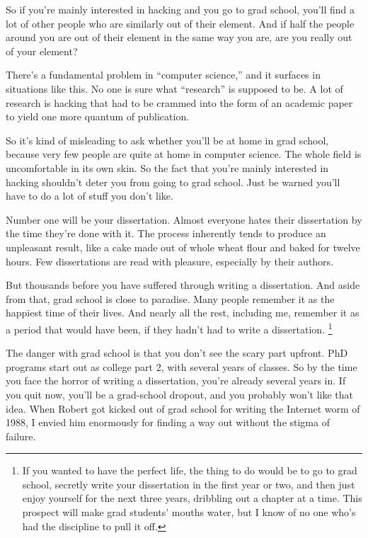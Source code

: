 So if you're mainly interested in hacking and you go to grad school,
you'll find a lot of other people who are similarly out of their
element. And if half the people around you are out of their element in
the same way you are, are you really out of your element?

There's a fundamental problem in ``computer science,'' and it surfaces
in situations like this. No one is sure what ``research'' is supposed to
be. A lot of research is hacking that had to be crammed into the form of
an academic paper to yield one more quantum of publication.

So it's kind of misleading to ask whether you'll be at home in grad
school, because very few people are quite at home in computer science.
The whole field is uncomfortable in its own skin. So the fact that
you're mainly interested in hacking shouldn't deter you from going to
grad school. Just be warned you'll have to do a lot of stuff you don't
like.

Number one will be your dissertation. Almost everyone hates their
dissertation by the time they're done with it. The process inherently
tends to produce an unpleasant result, like a cake made out of whole
wheat flour and baked for twelve hours. Few dissertations are read with
pleasure, especially by their authors.

But thousands before you have suffered through writing a dissertation.
And aside from that, grad school is close to paradise. Many people
remember it as the happiest time of their lives. And nearly all the
rest, including me, remember it as a period that would have been, if
they hadn't had to write a dissertation. \footnote{If you wanted to have the perfect life, the thing to do would be
to go to grad school, secretly write your dissertation in the first year
or two, and then just enjoy yourself for the next three years, dribbling
out a chapter at a time. This prospect will make grad students' mouths
water, but I know of no one who's had the discipline to pull it off.}

The danger with grad school is that you don't see the scary part
upfront. PhD programs start out as college part 2, with several years of
classes. So by the time you face the horror of writing a dissertation,
you're already several years in. If you quit now, you'll be a
grad-school dropout, and you probably won't like that idea. When Robert
got kicked out of grad school for writing the Internet worm of 1988, I
envied him enormously for finding a way out without the stigma of
failure.

